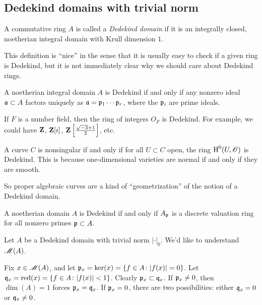 \subsection{Dedekind domains with trivial norm}

\begin{definition}
A commutative ring $A$ is called a \emph{Dedekind domain}  if it is an 
integrally closed, noetherian integral domain with Krull dimension $1$. 
\end{definition}

This definition is ``nice'' in the sense that it is usually easy to check if 
a given ring is Dedekind, but it is not immediately clear why we should care 
about Dedekind rings. 

\begin{theorem}
A noetherian integral domain $A$ is Dedekind if and only if any nonzero ideal 
$\mathfrak{a}\subset A$ factors uniquely as $\mathfrak{a}=\mathfrak{p}_1\cdots \mathfrak{p}_r$, where the $\mathfrak{p}_i$ 
are prime ideals. 
\end{theorem}

\begin{example}
If $F$ is a number field, then the ring of integers $O_F$ is Dedekind. For 
example, we could have $\mathbf{Z}$, $\mathbf{Z}[i]$, 
$\mathbf{Z}\left[\frac{\sqrt{-3}+1}{2}\right]$, etc.
\end{example}

\begin{example}
A curve $C$ is nonsingular if and only if for all $U\subset C$ open, the 
ring $\operatorname{H}^0(U,\mathscr{O})$ is Dedekind. This is because one-dimensional varieties are 
normal if and only if they are smooth. 
\end{example}

So proper algebraic curves are a kind of ``geometrization'' of the notion of 
a Dedekind domain. 

\begin{lemma}
A noetherian domain $A$ is Dedekind if and only if $A_{\mathfrak{p}}$ is a discrete 
valuation ring for all nonzero primes $\mathfrak{p}\subset A$. 
\end{lemma}

Let $A$ be a Dedekind domain with trivial norm $|\cdot|_0$. We'd like to 
understand $\operatorname{\mathscr{M}}(A)$. 
\begin{center}
\end{center}
Fix $x\in \operatorname{\mathscr{M}}(A)$, and let $\mathfrak{p}_x=\ker(x)=\{f\in A\colon |f(x)|=0\}$. 
Let $\mathfrak{q}_x=\operatorname{red}(x) = \{f\in A\colon |f(x)|<1\}$. Clearly $\mathfrak{p}_x\subset \mathfrak{q}_x$. 
If $\mathfrak{p}_x\ne 0$, then $\dim(A)=1$ forces $\mathfrak{p}_x=\mathfrak{q}_x$. If $\mathfrak{p}_x=0$, there 
are two possibilities: either $\mathfrak{q}_x=0$ or $\mathfrak{q}_x\ne 0$. 

